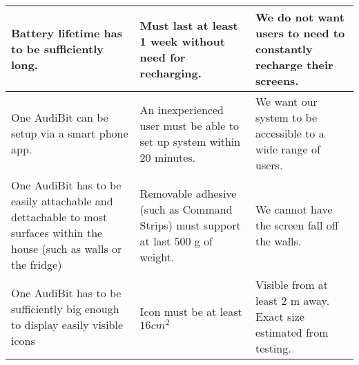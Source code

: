 \begin{center}
\tablelasttail{\hline}
\begin{supertabular}{| p{32mm} | p{50mm} | p{53mm} | }
		\hline Battery lifetime has to be sufficiently long. & Must last at least 1 week without need for recharging. & We do not want users to need to constantly recharge their screens.\\
		\hline One AudiBit can be setup via a smart phone app. & An inexperienced user must be able to set up system within 20 minutes. & We want our system to be accessible to a wide range of users.\\
		\hline One AudiBit has to be easily attachable and dettachable to most surfaces within the house (such as walls or the fridge) & Removable adhesive (such as Command Strips) must support at last 500 g of weight. & We cannot have the screen fall off the walls.\\
		\hline One AudiBit has to be sufficiently big enough to display easily visible icons &  Icon must be at least $16 cm^2$ & Visible from at least 2 m away. Exact size estimated from testing.\\
\end{supertabular}
\end{center}

